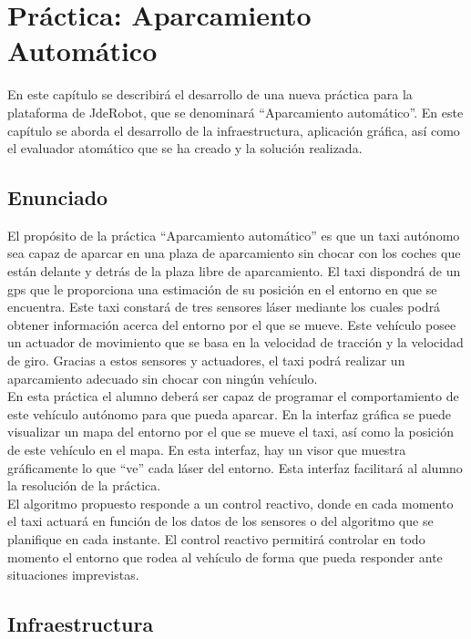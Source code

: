 \chapter{Práctica: Aparcamiento Automático}\label{cap.autoparking}
En este capítulo se describirá el desarrollo de una nueva práctica para la plataforma de JdeRobot, que se denominará ``Aparcamiento automático''. En este capítulo se aborda el desarrollo de la infraestructura, aplicación gráfica, así como el evaluador atomático que se ha creado y la solución realizada.  

\section{Enunciado}
El propósito de la práctica ``Aparcamiento automático'' es que un taxi autónomo sea capaz de aparcar en una plaza de aparcamiento sin chocar con los coches que están delante y detrás de la plaza libre de aparcamiento. El taxi dispondrá de un \acrshort{gps} que le proporciona una estimación de su posición en el entorno en que se encuentra. Este taxi constará de tres sensores láser mediante los cuales podrá obtener información acerca del entorno por el que se mueve. Este vehículo posee un actuador de movimiento que se basa en la velocidad de tracción y la velocidad de giro. Gracias a estos sensores y actuadores, el taxi podrá realizar un aparcamiento adecuado sin chocar con ningún vehículo.\\

En esta práctica el alumno deberá ser capaz de programar el comportamiento de este vehículo autónomo para que pueda aparcar. En la interfaz gráfica se puede visualizar un mapa del entorno por el que se mueve el taxi, así como la posición de este vehículo en el mapa. En esta interfaz, hay un visor que muestra gráficamente lo que ``ve'' cada láser del entorno. Esta interfaz facilitará al alumno la resolución de la práctica.\\

El algoritmo propuesto responde a un control reactivo, donde en cada momento el taxi actuará en función de los datos de los sensores o del algoritmo que se planifique en cada instante. El control reactivo permitirá controlar en todo momento el entorno que rodea al vehículo de forma que pueda responder ante situaciones imprevistas.

\section{Infraestructura}

